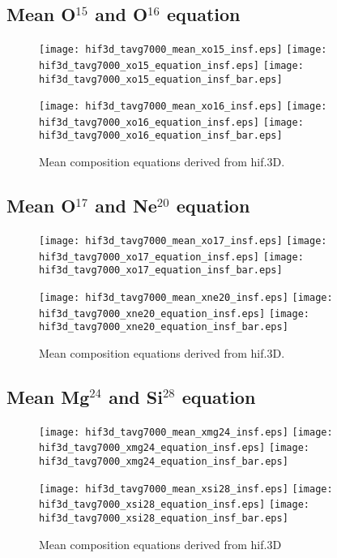 \documentclass[10pt,paper=a4]{report}
\begin{document}
\newpage

\subsection{Mean O$^{15}$ and O$^{16}$ equation}

\begin{figure}[!h]
\centerline{
\texttt{[image: hif3d\_tavg7000\_mean\_xo15\_insf.eps]}
\texttt{[image: hif3d\_tavg7000\_xo15\_equation\_insf.eps]}
\texttt{[image: hif3d\_tavg7000\_xo15\_equation\_insf\_bar.eps]}}

\centerline{
\texttt{[image: hif3d\_tavg7000\_mean\_xo16\_insf.eps]}
\texttt{[image: hif3d\_tavg7000\_xo16\_equation\_insf.eps]}
\texttt{[image: hif3d\_tavg7000\_xo16\_equation\_insf\_bar.eps]}}
\caption{Mean composition equations derived from {\sf hif.3D}. \label{fig:x-equations}}
\end{figure}

\newpage

\subsection{Mean O$^{17}$ and Ne$^{20}$ equation}

\begin{figure}[!h]
\centerline{
\texttt{[image: hif3d\_tavg7000\_mean\_xo17\_insf.eps]}
\texttt{[image: hif3d\_tavg7000\_xo17\_equation\_insf.eps]}
\texttt{[image: hif3d\_tavg7000\_xo17\_equation\_insf\_bar.eps]}}

\centerline{
\texttt{[image: hif3d\_tavg7000\_mean\_xne20\_insf.eps]}
\texttt{[image: hif3d\_tavg7000\_xne20\_equation\_insf.eps]}
\texttt{[image: hif3d\_tavg7000\_xne20\_equation\_insf\_bar.eps]}}
\caption{Mean composition equations derived from {\sf hif.3D}. \label{fig:x-equations}}
\end{figure}

\newpage

\subsection{Mean Mg$^{24}$ and Si$^{28}$ equation}

\begin{figure}[!h]
\centerline{
\texttt{[image: hif3d\_tavg7000\_mean\_xmg24\_insf.eps]}
\texttt{[image: hif3d\_tavg7000\_xmg24\_equation\_insf.eps]}
\texttt{[image: hif3d\_tavg7000\_xmg24\_equation\_insf\_bar.eps]}}

\centerline{
\texttt{[image: hif3d\_tavg7000\_mean\_xsi28\_insf.eps]}
\texttt{[image: hif3d\_tavg7000\_xsi28\_equation\_insf.eps]}
\texttt{[image: hif3d\_tavg7000\_xsi28\_equation\_insf\_bar.eps]}}
\caption{Mean composition equations derived from {\sf hif.3D} \label{fig:x-equations}}
\end{figure}
\end{document}
